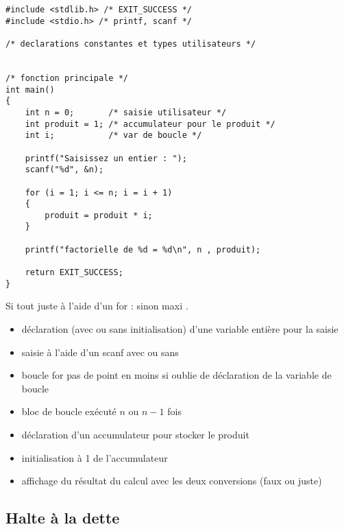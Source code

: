 \begin{correction}
  \begin{small}
\begin{verbatim}
#include <stdlib.h> /* EXIT_SUCCESS */
#include <stdio.h> /* printf, scanf */

/* declarations constantes et types utilisateurs */


/* fonction principale */
int main()
{
    int n = 0;       /* saisie utilisateur */
    int produit = 1; /* accumulateur pour le produit */
    int i;           /* var de boucle */

    printf("Saisissez un entier : ");
    scanf("%d", &n);

    for (i = 1; i <= n; i = i + 1)
    {
        produit = produit * i;
    }

    printf("factorielle de %d = %d\n", n , produit);
    
    return EXIT_SUCCESS;
}
\end{verbatim}
  \end{small}
  
  \begin{baremeenv}
Si tout juste à l'aide d'un for :  sinon maxi .
    \begin{itemize}
      \item {}  déclaration (avec ou sans initialisation) d'une variable
        entière pour la saisie
      \item {} saisie à l'aide d'un scanf avec ou sans 
      \item {} boucle for pas de point en moins si oublie de
        déclaration de la variable de boucle
      \item {} bloc de boucle exécuté $n$ ou  $n - 1$ fois
      \item {} déclaration d'un accumulateur pour stocker le
      produit
    \item {} initialisation à 1 de l'accumulateur
    \item {} affichage du résultat du calcul avec les deux
      conversions (faux ou juste)
    \end{itemize}
  \end{baremeenv}
\end{correction}

\subsection{Halte à la dette}

